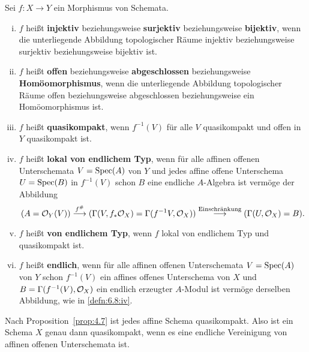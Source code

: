\begin{defn}
\label{defn:6.8}
	Sei $f\colon X \to Y$ ein Morphismus von Schemata.
	\begin{enumerate}[i)]
		\item $f$ heißt \textbf{injektiv} beziehungsweise \textbf{surjektiv} beziehungsweise \textbf{bijektiv}, wenn die unterliegende Abbildung topologischer Räume injektiv beziehungsweise surjektiv beziehungsweise bijektiv ist.
		\item $f$ heißt \textbf{offen} beziehungsweise \textbf{abgeschlossen} beziehungsweise \textbf{Homöomorphismus}, wenn die unterliegende Abbildung topologischer Räume  offen beziehungsweise abgeschlossen beziehungsweise ein Homöomorphismus ist.
		\item $f$ heißt \textbf{quasikompakt}, wenn $f^{-1}(V)$ für alle $V$ quasikompakt und offen in $Y$ quasikompakt ist.
		\item\label{defn:6.8:iv} $f$ heißt \textbf{lokal von endlichem Typ}, wenn für alle affinen offenen Unterschemata $V=\operatorname{Spec}(A)$ von $Y$ und jedes affine offene Unterschema $U = \operatorname{Spec}(B)$ in $f^{-1}(V)$ schon $B$ eine endliche $A$-Algebra ist vermöge der Abbildung
		\[
			(A = \mathcal{O}_{Y}(V))\overset{f^{\#}}{\longrightarrow}(\Gamma(V,f_*\mathcal{O}_X)=\Gamma(f^{-1}V,\mathcal{O}_X))\overset{\text{Einschränkung}}{\longrightarrow}(\Gamma(U,\mathcal{O}_X) = B).
		\]
		\item $f$ heißt \textbf{von endlichem Typ}, wenn $f$ lokal von endlichem Typ und quasikompakt ist.
		\item $f$ heißt \textbf{endlich}, wenn für alle affinen offenen Unterschemata $V = \operatorname{Spec}(A)$ von $Y$ schon $f^{-1}(V)$ ein affines offenes Unterschema von $X$ und $B = \Gamma(f^{-1}(V),\mathcal{O}_X)$ ein endlich erzeugter $A$-Modul ist vermöge derselben Abbildung, wie in \ref{defn:6.8:iv}.
	\end{enumerate}
\end{defn}

\begin{bem}
\label{bem:6.9}
	Nach Proposition~\ref{prop:4.7} ist jedes affine Schema quasikompakt. Also ist ein Schema $X$ genau dann quasikompakt, wenn es eine endliche Vereinigung von affinen offenen Unterschemata ist.
\end{bem}

